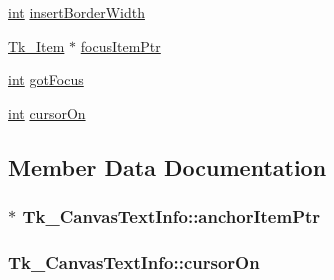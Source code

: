 \begin{DoxyCompactItemize}
\item 
\hyperlink{tk_8h_a83f82f76e7fed06f4c49d2db94028a6d}{int} \hyperlink{struct_tk___canvas_text_info_a5db3567a3897fc85e868b6f281cd9fb0}{insert\+Border\+Width}
\item 
\hyperlink{struct_tk___item}{Tk\+\_\+\+Item} $\ast$ \hyperlink{struct_tk___canvas_text_info_a44fd05a38814f0bc436b199cc820c317}{focus\+Item\+Ptr}
\item 
\hyperlink{tk_8h_a83f82f76e7fed06f4c49d2db94028a6d}{int} \hyperlink{struct_tk___canvas_text_info_a817b1de619d13d4a997e1a21bd4f272e}{got\+Focus}
\item 
\hyperlink{tk_8h_a83f82f76e7fed06f4c49d2db94028a6d}{int} \hyperlink{struct_tk___canvas_text_info_acf2553931c91106e32fc6a58cd8bdee3}{cursor\+On}
\end{DoxyCompactItemize}


\subsection{Member Data Documentation}
\subsubsection[{\texorpdfstring{anchor\+Item\+Ptr}{anchorItemPtr}}]{$\ast$ Tk\+\_\+\+Canvas\+Text\+Info\+::anchor\+Item\+Ptr}\hypertarget{struct_tk___canvas_text_info_ac237925f3940fa261bc70e1944209471}{}\label{struct_tk___canvas_text_info_ac237925f3940fa261bc70e1944209471}
\subsubsection[{\texorpdfstring{cursor\+On}{cursorOn}}]{ Tk\+\_\+\+Canvas\+Text\+Info\+::cursor\+On}\hypertarget{struct_tk___canvas_text_info_acf2553931c91106e32fc6a58cd8bdee3}{}\label{struct_tk___canvas_text_info_acf2553931c91106e32fc6a58cd8bdee3}
